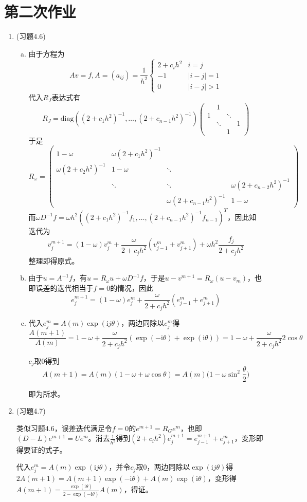 \documentclass[a4paper,UTF8,fontset=windows]{ctexart}
\begin{document}
\section{第二次作业}
\begin{enumerate}
    \item (习题4.6)
    \begin{enumerate}[(a)]
    \item
    由于方程为
    $$Av=f,A=(a_{ij})=\frac{1}{h^2}\begin{cases}2+c_ih^2&i=j\\-1&|i-j|=1\\0&|i-j|>1\end{cases}$$
    代入$R_J$表达式有
    $$R_J=\mathrm{diag}((2+c_1h^2)^{-1},\dots,(2+c_{n-1}h^2)^{-1})\begin{pmatrix}&1\\1&&\ddots\\ &\ddots&&1\\ &&1&\end{pmatrix}$$
    于是
    $$R_\omega=\begin{pmatrix}1-\omega&\omega(2+c_1h^2)^{-1}\\\omega(2+c_2h^2)^{-1}&1-\omega&\ddots\\ &\ddots&\ddots&\omega(2+c_{n-2}h^2)^{-1}\\ &&\omega(2+c_{n-1}h^2)^{-1}&1-\omega\end{pmatrix}$$
    而$\omega D^{-1}f=\omega h^2((2+c_1h^2)^{-1}f_1,\dots,(2+c_{n-1}h^2)^{-1}f_{n-1})^T$，因此知迭代为
    $$v_j^{m+1}=(1-\omega)v_j^m+\frac{\omega}{2+c_jh^2}(v_{j-1}^m+v_{j+1}^m)+\omega h^2\frac{f_j}{2+c_jh^2}$$
    整理即得原式。
    
    \item
    由于$u=A^{-1}f$，有$u=R_\omega u+\omega D^{-1}f$，于是$u-v^{m+1}=R_\omega(u-v_m)$，也即误差的迭代相当于$f=0$的情况，因此
    $$e_j^{m+1}=(1-\omega)e_j^m+\frac{\omega}{2+c_jh^2}(e_{j-1}^m+e_{j+1}^m)$$
    
    \item
    代入$e_j^m=A(m)\exp(\mathrm{i}j\theta)$，两边同除以$e_j^m$得
    $$\frac{A(m+1)}{A(m)}=1-\omega+\frac{\omega}{2+c_jh^2}(\exp(-\mathrm{i}\theta)+\exp(\mathrm{i}\theta))=1-\omega+\frac{\omega}{2+c_jh^2}2\cos\theta$$
    
    $c_j$取0得到
    $$A(m+1)=A(m)(1-\omega+\omega\cos\theta)=A(m)\bigg(1-\omega\sin^2\frac{\theta}{2}\bigg)$$
    
    即为所求。
    \end{enumerate}
    
    \item (习题4.7)
    
    类似习题4.6，误差迭代满足令$f=0$的$e^{m+1}=R_Ge^m$，也即$(D-L)e^{m+1}=Ue^m$。消去$\frac{1}{h^2}$得到$(2+c_ih^2)e^{m+1}_j=e^{m+1}_{j-1}+e^m_{j+1}$，变形即得要证的式子。
    
    代入$e_j^m=A(m)\exp(\mathrm{i}j\theta)$，并令$c_j$取0，两边同除以$\exp(\mathrm{i}j\theta)$得$2A(m+1)=A(m+1)\exp(-\mathrm{i}\theta)+A(m)\exp(\mathrm{i}\theta)$，变形得$A(m+1)=\frac{\exp(\mathrm{i}\theta)}{2-\exp(-\mathrm{i}\theta)}A(m)$，得证。    
\end{enumerate}
\end{document}
